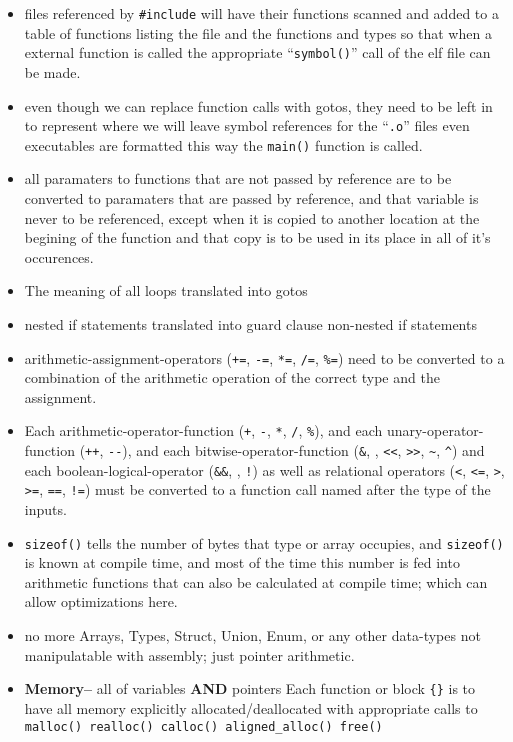 \begin{itemize}
\tightlist
\item
  files referenced by \texttt{\#include} will have their functions
  scanned and added to a table of functions listing the file and the
  functions and types so that when a external function is called the
  appropriate ``\texttt{symbol()}'' call of the elf file can be made.
\item
  even though we can replace function calls with gotos, they need to be
  left in to represent where we will leave symbol references for the
  ``\texttt{.o}'' files even executables are formatted this way the
  \texttt{main()} function is called.
\item
  all paramaters to functions that are not passed by reference are to be
  converted to paramaters that are passed by reference, and that
  variable is never to be referenced, except when it is copied to
  another location at the begining of the function and that copy is to
  be used in its place in all of it's occurences.
\item
  The meaning of all loops translated into gotos
\item
  nested if statements translated into guard clause non-nested if
  statements
\item
  arithmetic-assignment-operators (\texttt{+=}, \texttt{-=},
  \texttt{*=}, \texttt{/=}, \texttt{\%=}) need to be converted to a
  combination of the arithmetic operation of the correct type and the
  assignment.
\item
  Each arithmetic-operator-function (\texttt{+}, \texttt{-}, \texttt{*},
  \texttt{/}, \texttt{\%}), and each unary-operator-function
  (\texttt{++}, \texttt{-\/-}), and each bitwise-operator-function
  (\texttt{\&}, \texttt{\textbar{}}, \texttt{\textless{}\textless{}},
  \texttt{\textgreater{}\textgreater{}}, \texttt{\textasciitilde{}},
  \texttt{\^{}}) and each boolean-logical-operator (\texttt{\&\&},
  \texttt{\textbar{}\textbar{}}, \texttt{!}) as well as relational
  operators (\texttt{\textless{}}, \texttt{\textless{}=},
  \texttt{\textgreater{}}, \texttt{\textgreater{}=}, \texttt{==},
  \texttt{!=}) must be converted to a function call named after the type
  of the inputs.
\item
  \texttt{sizeof()} tells the number of bytes that type or array
  occupies, and \texttt{sizeof()} is known at compile time, and most of
  the time this number is fed into arithmetic functions that can also be
  calculated at compile time; which can allow optimizations here.
\item
  no more Arrays, Types, Struct, Union, Enum, or any other data-types
  not manipulatable with assembly; just pointer arithmetic.
\item
  \textbf{Memory--} all of variables \textbf{AND} pointers Each function
  or block \texttt{\{\}} is to have all memory explicitly
  allocated/deallocated with appropriate calls to
  \texttt{malloc()\ realloc()\ calloc()\ aligned\_alloc()\ free()}
\end{itemize}

